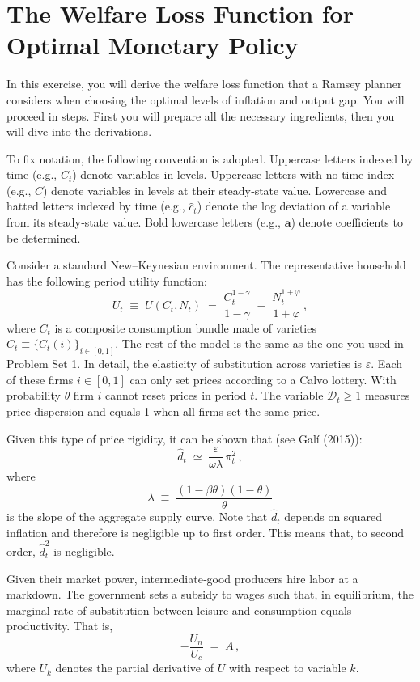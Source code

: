 \documentclass[a4paper,12pt]{article}
\theoremstyle{remark}
\begin{document}
\section{The Welfare Loss Function for Optimal Monetary Policy}

In this exercise, you will derive the welfare loss function that a Ramsey planner considers when choosing the optimal levels of inflation and output gap. You will proceed in steps. First you will prepare all the necessary ingredients, then you will dive into the derivations.

To fix notation, the following convention is adopted. Uppercase letters indexed by time (e.g., \(C_t\)) denote variables in levels. Uppercase letters with no time index (e.g., \(C\)) denote variables in levels at their steady‐state value. Lowercase and hatted letters indexed by time (e.g., \(\hat c_t\)) denote the log deviation of a variable from its steady‐state value. Bold lowercase letters (e.g., \(\mathbf{a}\)) denote coefficients to be determined.

Consider a standard New–Keynesian environment. The representative household has the following period utility function:
\begin{equation}\label{eq:utility}
U_t \;\equiv\; U(C_t, N_t)
\;=\;
\frac{C_t^{1-\gamma}}{1-\gamma}
\;-\;
\frac{N_t^{1+\varphi}}{1+\varphi}\,,
\end{equation}
where \(C_t\) is a composite consumption bundle made of varieties \(C_t\equiv\{C_t(i)\}_{i\in[0,1]}\). The rest of the model is the same as the one you used in Problem Set 1. In detail, the elasticity of substitution across varieties is \(\varepsilon\). Each of these firms \(i\in[0,1]\) can only set prices according to a Calvo lottery. With probability \(\theta\) firm \(i\) cannot reset prices in period \(t\). The variable \(\mathcal{D}_t\ge1\) measures price dispersion and equals 1 when all firms set the same price.

Given this type of price rigidity, it can be shown that (see Galí (2015)):
\begin{equation}\label{eq:dispersion}
\hat d_t \;\simeq\; \frac{\varepsilon}{\omega\lambda}\,\pi_t^2\,,
\end{equation}
where
\[
\lambda \;\equiv\;\frac{(1 - \beta\theta)(1-\theta)}{\theta}
\]
is the slope of the aggregate supply curve. Note that \(\hat d_t\) depends on squared inflation and therefore is negligible up to first order. This means that, to second order, \(\hat d_t^2\) is negligible.

Given their market power, intermediate‐good producers hire labor at a markdown. The government sets a subsidy to wages such that, in equilibrium, the marginal rate of substitution between leisure and consumption equals productivity. That is,
\begin{equation}\label{eq:MRS}
-\frac{U_n}{U_c} \;=\; A\,,
\end{equation}
where \(U_k\) denotes the partial derivative of \(U\) with respect to variable \(k\).
\end{document}
